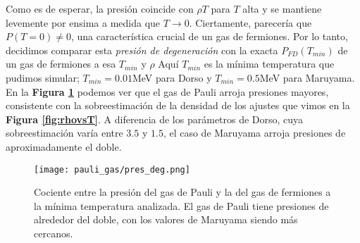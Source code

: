 Como es de esperar, la presión coincide con $\rho T$ para $T$ alta y se mantiene levemente por ensima a medida que $T\to0$.
Ciertamente, parecería que $P(T=0)\neq0$, una característica crucial de un gas de fermiones.
Por lo tanto, decidimos comparar esta \textit{presión de degeneración} con la exacta $P_{FD}(T_{min})$ de un gas de fermiones a esa $T_{min}$ y $\rho$
Aquí $T_{min}$ es la mínima temperatura que pudimos simular; $T_{min}=0.01$MeV para Dorso y $T_{min}=0.5$MeV para Maruyama.
En la \textbf{Figura \ref{fig:Pdeg}} podemos ver que el gas de Pauli arroja presiones mayores, consistente con la sobreestimación de la densidad de los ajustes que vimos en la \textbf{Figura \ref{fig:rhovsT}}.
A diferencia de los parámetros de Dorso, cuya sobreestimación varía entre $3.5$ y $1.5$, el caso de Maruyama arroja presiones de aproximadamente el doble.

\begin{figure}[H]
	\centering	%
	\texttt{[image: pauli\_gas/pres\_deg.png]}
	\caption{Cociente entre la presión del gas de Pauli y la del gas de fermiones a la mínima temperatura analizada.
	El gas de Pauli tiene presiones de alrededor del doble, con los valores de Maruyama siendo más cercanos.}
	\label{fig:Pdeg}
\end{figure}